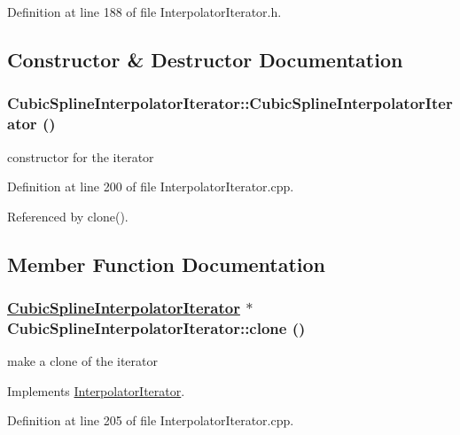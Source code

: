 Definition at line 188 of file Interpolator\-Iterator.h.

\subsection{Constructor \& Destructor Documentation}
\hypertarget{classCubicSplineInterpolatorIterator_a0}{
\subsubsection[CubicSplineInterpolatorIterator]{\setlength{\rightskip}{0pt plus 5cm}Cubic\-Spline\-Interpolator\-Iterator::Cubic\-Spline\-Interpolator\-Iterator ()}}
\label{classCubicSplineInterpolatorIterator_a0}


constructor for the iterator 



Definition at line 200 of file Interpolator\-Iterator.cpp.

Referenced by clone().

\subsection{Member Function Documentation}
\hypertarget{classCubicSplineInterpolatorIterator_a1}{
\subsubsection[clone]{\setlength{\rightskip}{0pt plus 5cm}\hyperlink{classCubicSplineInterpolatorIterator}{Cubic\-Spline\-Interpolator\-Iterator} $\ast$ Cubic\-Spline\-Interpolator\-Iterator::clone ()}}
\label{classCubicSplineInterpolatorIterator_a1}


make a clone of the iterator 



Implements \hyperlink{classInterpolatorIterator_a2}{Interpolator\-Iterator}.

Definition at line 205 of file Interpolator\-Iterator.cpp.

